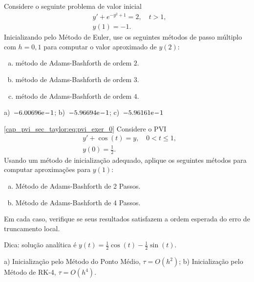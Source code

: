 \begin{exer}
  Considere o seguinte problema de valor inicial
  \begin{subequations}
    \begin{align}
      &y' + e^{-y^2+1} = 2,\quad t>1,\\
      &y(1) = -1.
    \end{align}
  \end{subequations}
  Inicializando pelo Método de Euler, use os seguintes métodos de passo múltiplo com $h=0,1$ para computar o valor aproximado de $y(2)$:
  \begin{enumerate}[a)]
  \item método de Adams-Bashforth de ordem $2$.
  \item método de Adams-Bashforth de ordem $3$.
  \item método de Adams-Bashforth de ordem $4$.
  \end{enumerate}
\end{exer}
\begin{resp}
  a)~$-6.00696\mathrm{e}\!-\!1$; b)~$-5.96694\mathrm{e}\!-\!1$; c)~$-5.96161\mathrm{e}\!-\!1$
\end{resp}

\begin{exer}\eqref{cap_pvi_sec_taylor:eq:pvi_exer_0}
  Considere o PVI
  \begin{subequations}
    \begin{align}
      &y' + \cos(t) = y,\quad 0 < t \leq 1,\\
      &y(0) = \frac{1}{2}.
    \end{align}
  \end{subequations}
  Usando um método de inicialização adequado, aplique os seguintes métodos para computar aproximações para $y(1)$:
  \begin{enumerate}[a)]
  \item Método de Adams-Bashforth de 2 Passos.
  \item Método de Adams-Bashforth de 4 Passos.
  \end{enumerate}
  Em cada caso, verifique se seus resultados satisfazem a ordem esperada do erro de truncamento local.
\end{exer}
\begin{resp}
  Dica: solução analítica é $y(t) = \frac{1}{2}\cos(t) - \frac{1}{2}\sin(t)$.
  
  a) Inicialização pelo Método do Ponto Médio, $\tau = O(h^2)$; b) Inicialização pelo Método de RK-4, $\tau = O(h^4)$.
\end{resp}

